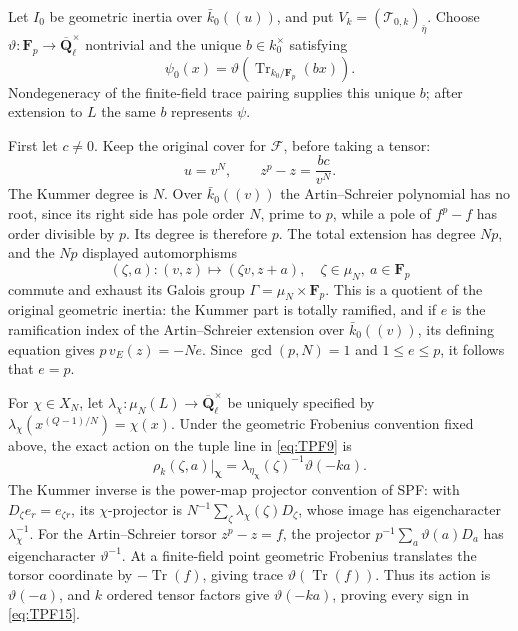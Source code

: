 Let \(I_0\) be geometric inertia over \(\bar k_0((u))\),
and put \(V_k=(\mathcal T_{0,k})_{\bar\eta}\).
Choose \(\vartheta:\mathbf F_p\to
\overline{\mathbf Q}_\ell^\times\) nontrivial and the unique
\(b\in k_0^\times\) satisfying
\[
 \psi_0(x)=\vartheta(\operatorname{Tr}_{k_0/\mathbf F_p}(bx)).
 \tag{TPF.12}\label{eq:TPF12}
\]
Nondegeneracy of the finite-field trace pairing supplies
this unique \(b\); after extension to \(L\) the same \(b\)
represents \(\psi\).

First let \(c\ne0\). Keep the original cover for
\(\mathcal F\), before taking a tensor:
\[
 u=v^N,\qquad z^p-z=\frac{bc}{v^N}.
 \tag{TPF.13}\label{eq:TPF13}
\]
The Kummer degree is \(N\). Over \(\bar k_0((v))\) the
Artin--Schreier polynomial has no root, since its right
side has pole order \(N\), prime to \(p\), while a pole
of \(f^p-f\) has order divisible by \(p\). Its degree is
therefore \(p\). The total extension has degree \(Np\),
and the \(Np\) displayed automorphisms
\[
 (\zeta,a):(v,z)\longmapsto(\zeta v,z+a),
 \quad \zeta\in\mu_N,\ a\in\mathbf F_p
 \tag{TPF.14}\label{eq:TPF14}
\]
commute and exhaust its Galois group
\(\Gamma=\mu_N\times\mathbf F_p\). This is a quotient of
the original geometric inertia: the Kummer part is
totally ramified, and if \(e\) is the ramification index
of the Artin--Schreier extension over \(\bar k_0((v))\),
its defining equation gives \(p\,v_E(z)=-Ne\).
Since \(\gcd(p,N)=1\) and \(1\le e\le p\), it follows
that \(e=p\).

For \(\chi\in X_N\), let
\(\lambda_\chi:\mu_N(L)\to\overline{\mathbf Q}_\ell^\times\)
be uniquely specified by
\(\lambda_\chi(x^{(Q-1)/N})=\chi(x)\).
Under the geometric Frobenius convention fixed above, the
exact action on the tuple line in \eqref{eq:TPF9} is
\[
 \rho_k(\zeta,a)\big|_{\boldsymbol\chi}
    =\lambda_{\eta_{\boldsymbol\chi}}(\zeta)^{-1}
                         \vartheta(-ka).
 \tag{TPF.15}\label{eq:TPF15}
\]
The Kummer inverse is the power-map projector convention
of SPF: with \(D_\zeta e_r=e_{\zeta r}\), its
\(\chi\)-projector is
\(N^{-1}\sum_\zeta\lambda_\chi(\zeta)D_\zeta\), whose
image has eigencharacter \(\lambda_\chi^{-1}\).
For the Artin--Schreier torsor \(z^p-z=f\), the
projector \(p^{-1}\sum_a\vartheta(a)D_a\) has
eigencharacter \(\vartheta^{-1}\).
At a finite-field point geometric Frobenius translates
the torsor coordinate by
\(-\operatorname{Tr}(f)\), giving trace
\(\vartheta(\operatorname{Tr}(f))\).
Thus its action is \(\vartheta(-a)\), and \(k\) ordered
tensor factors give \(\vartheta(-ka)\), proving every
sign in \eqref{eq:TPF15}.

